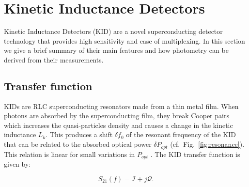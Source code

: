 
\section{Kinetic Inductance Detectors}
\label{se:kids}


%




Kinetic Inductance Detectors (KID) are a novel superconducting detector technology
that provides high sensitivity and ease of multiplexing. In this section we give
a brief summary of their main features and how photometry can be derived from
their measurements.

\subsection{Transfer function}

KIDs are RLC superconducting resonators made from a thin metal film. When
photons are absorbed by the superconducting film, they break Cooper pairs which
increases the quasi-particles density and causes a change in the kinetic
inductance $L_{k}$. This produces a shift $\delta f_{0}$ of the resonant
frequency of the KID \citep{2013A&A...551L..12C} that can be related to the
absorbed optical power $\delta P_{opt}$ (cf.~Fig.~\ref{fig:resonance}). This
relation is linear for small variations in $P_{opt}$
\citep{2010ApPhL..96z3511S}. The KID transfer function is given by:

\begin{equation}
S_{21}(f) = \mathcal{I} +j\mathcal{Q} .
\end{equation}

